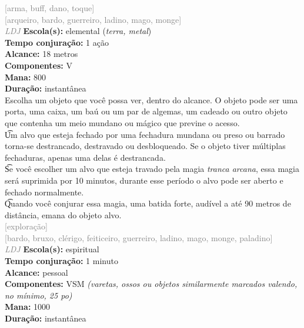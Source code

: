 \documentclass{RPG_Adventure}[2021/10/20]
\begin{document}
{\scriptsize \textcolor{gray}{[arma, buff, dano, toque]\\}}
{\scriptsize \textcolor{gray}{[arqueiro, bardo, guerreiro, ladino, mago, monge]\\}}
{\tiny \textcolor{gray}{\textit{LDJ}}}\jump{}
{\small \t \textbf{Escola(s):} elemental (\textit{terra, metal})\\\t \textbf{Tempo conjuração:} 1 ação\\\t \textbf{Alcance:} 18 metros\\\t \textbf{Componentes:} V\\\t \textbf{Mana:} 800\\\t \textbf{Duração:} instantânea\\}
{\normalsize Escolha um objeto que você possa ver, dentro do alcance. O objeto pode ser uma porta, uma caixa, um baú ou um par de algemas, um cadeado ou outro objeto que contenha um meio mundano ou mágico que previne o acesso.\\\t Um alvo que esteja fechado por uma fechadura mundana ou preso ou barrado torna-se destrancado, destravado ou desbloqueado. Se o objeto tiver múltiplas fechaduras, apenas uma delas é destrancada.\\\t Se você escolher um alvo que esteja travado pela magia \textit{tranca arcana}, essa magia será suprimida por 10 minutos, durante esse período o alvo pode ser aberto e fechado normalmente.\\\t Quando você conjurar essa magia, uma batida forte, audível a até 90 metros de distância, emana do objeto alvo.\\}
{\scriptsize \textcolor{gray}{[exploração]\\}}
{\scriptsize \textcolor{gray}{[bardo, bruxo, clérigo, feiticeiro, guerreiro, ladino, mago, monge, paladino]\\}}
{\tiny \textcolor{gray}{\textit{LDJ}}}\jump{}
{\small \t \textbf{Escola(s):} espiritual\\\t \textbf{Tempo conjuração:} 1 minuto\\\t \textbf{Alcance:} pessoal\\\t \textbf{Componentes:} VSM \textit{(varetas, ossos ou objetos similarmente marcados valendo, no mínimo, 25 po)}\\\t \textbf{Mana:} 1000\\\t \textbf{Duração:} instantânea\\}
\end{document}
